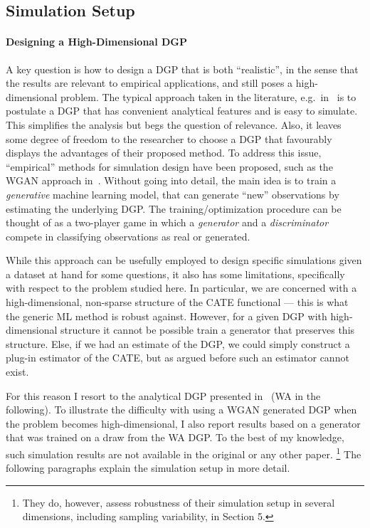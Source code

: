 \documentclass[11pt, a4paper, leqno]{article}
\begin{document}
\subsection{Simulation Setup}
\paragraph*{Designing a High-Dimensional DGP}
A key question is how to design a DGP that is both ``realistic'', in the sense that the results are relevant to empirical applications, and still poses a high-dimensional problem.
The typical approach taken in the literature, e.g.\ in~\cite{wager2018estimation} is to postulate a DGP that has convenient analytical features and is easy to simulate.
This simplifies the analysis but begs the question of relevance. Also, it leaves some degree of freedom to the researcher to choose a DGP that favourably displays the advantages of their proposed method.
To address this issue, ``empirical'' methods for simulation design have been proposed, such as the WGAN approach in~\cite{athey2024wgan}.
Without going into detail, the main idea is to train a \textit{generative} machine learning model, that can generate ``new'' observations by estimating the underlying DGP\@.
The training/optimization procedure can be thought of as a two-player game in which a \textit{generator} and a \textit{discriminator} compete in classifying observations as real or generated.

While this approach can be usefully employed to design specific simulations given a dataset at hand for some questions, it also has some limitations, specifically with respect to the problem studied here.
In particular, we are concerned with a high-dimensional, non-sparse structure of the CATE functional --- this is what the generic ML method is robust against.
However, for a given DGP with high-dimensional structure it cannot be possible train a generator that preserves this structure.
Else, if we had an estimate of the DGP, we could simply construct a plug-in estimator of the CATE, but as argued before such an estimator cannot exist.

For this reason I resort to the analytical DGP presented in~\cite{wager2018estimation} (WA in the following).
To illustrate the difficulty with using a WGAN generated DGP when the problem becomes high-dimensional, I also report results based on a generator that was trained on a draw from the WA DGP\@.
To the best of my knowledge, such simulation results are not available in the original or any other paper.
\footnote{They do, however, assess robustness of their simulation setup in several dimensions, including sampling variability, in Section 5.}
The following paragraphs explain the simulation setup in more detail.
\end{document}
